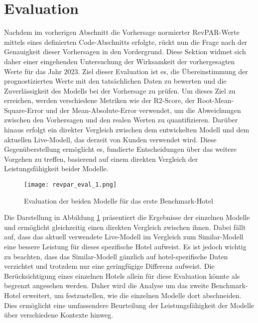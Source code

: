 \section{Evaluation}
\label{subsec:revpar_eval}
Nachdem im vorherigen Abschnitt die Vorhersage normierter RevPAR-Werte mittels eines definierten Code-Abschnitts erfolgte, rückt nun die Frage nach der Genauigkeit dieser Vorhersagen in den Vordergrund. Diese Sektion widmet sich daher einer eingehenden Untersuchung der Wirksamkeit der vorhergesagten Werte für das Jahr 2023. Ziel dieser Evaluation ist es, die Übereinstimmung der prognostizierten Werte mit den tatsächlichen Daten zu bewerten und die Zuverlässigkeit des Modells bei der Vorhersage zu prüfen.
\newline
\newline
Um dieses Ziel zu erreichen, werden verschiedene Metriken wie der R2-Score, der Root-Mean-Square-Error und der Mean-Absolute-Error verwendet, um die Abweichungen zwischen den Vorhersagen und den realen Werten zu quantifizieren. Darüber hinaus erfolgt ein direkter Vergleich zwischen dem entwickelten Modell und dem aktuellen Live-Modell, das derzeit von Kunden verwendet wird. Diese Gegenüberstellung ermöglicht es, fundierte Entscheidungen über das weitere Vorgehen zu treffen, basierend auf einem direkten Vergleich der Leistungsfähigkeit beider Modelle.

\begin{figure}[h]
    \centering
    \texttt{[image: revpar\_eval\_1.png]}
    \caption[Evaluation der beiden Modelle für das erste Benchmark-Hotel]{Evaluation der beiden Modelle für das erste Benchmark-Hotel}
    \label{img:revpar_eval_1}
\end{figure}

Die Darstellung in Abbildung \ref{img:revpar_eval_1} präsentiert die Ergebnisse der einzelnen Modelle und ermöglicht gleichzeitig einen direkten Vergleich zwischen ihnen. Dabei fällt auf, dass das aktuell verwendete Live-Modell im Vergleich zum Similar-Modell eine bessere Leistung für dieses spezifische Hotel aufweist. Es ist jedoch wichtig zu beachten, dass das Similar-Modell gänzlich auf hotel-spezifische Daten verzichtet und trotzdem nur eine geringfügige Differenz aufweist.
\newline
\newline
Die Berücksichtigung eines einzelnen Hotels allein für diese Evaluation könnte als begrenzt angesehen werden. Daher wird die Analyse um das zweite Benchmark-Hotel erweitert, um festzustellen, wie die einzelnen Modelle dort abschneiden. Dies ermöglicht eine umfassendere Beurteilung der Leistungsfähigkeit der Modelle über verschiedene Kontexte hinweg.

